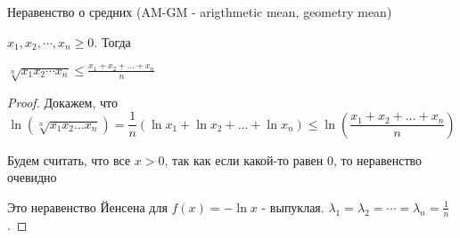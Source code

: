 \begin{theorem-non}
    Неравенство о средних (AM-GM - arigthmetic mean, geometry mean)

    $x_1, x_2, \cdots, x_n \geqslant 0$. Тогда

    $\sqrt[n]{x_1x_2\cdots x_n} \leqslant \frac{x_1+x_2+\dots+x_n}{n}$
\end{theorem-non}

\begin{proof}
    Докажем, что \[\ln (\sqrt[n]{x_1x_2\dots x_n}) = \frac{1}{n}(\ln x_1 + \ln x_2 + \dots + \ln x_n) 
    \leqslant \ln (\frac{x_1+x_2+\dots+x_n}{n})\]

    Будем считать, что все $x > 0$, так как если какой-то равен 0, то неравенство очевидно

    
    Это неравенство Йенсена для $f(x) = -\ln x$ - выпуклая.
    $\lambda_1 = \lambda_2 = \cdots = \lambda_n = \frac{1}{n} $.
\end{proof}